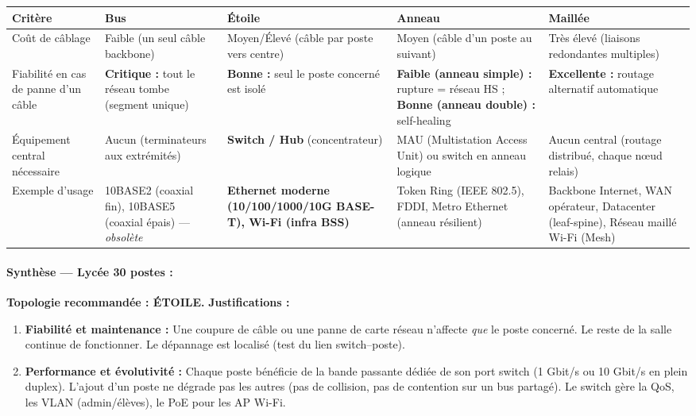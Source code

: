 \documentclass[11pt]{article}
\newcommand{\cle}[1]{{\popxbold\color{popdark}#1}}
\begin{document}
\begin{corrige}
\begin{center}
\begin{tabularx}{\linewidth}{|l|X|X|X|X|}
\hline
\rowcolor{popblueL} \textbf{Critère} & \textbf{Bus} & \textbf{\cle{Étoile}} & \textbf{\cle{Anneau}} & \textbf{\cle{Maillée}} \\
\hline
Coût de câblage & Faible (un seul câble backbone) & Moyen/Élevé (câble par poste vers centre) & Moyen (câble d'un poste au suivant) & Très élevé (liaisons redondantes multiples) \\
\hline
Fiabilité en cas de panne d'un câble & \textbf{Critique :} tout le réseau tombe (segment unique) & \textbf{Bonne :} seul le poste concerné est isolé & \textbf{Faible (anneau simple) :} rupture = réseau HS ; \textbf{Bonne (anneau double) :} self-healing & \textbf{Excellente :} routage alternatif automatique \\
\hline
Équipement central nécessaire & Aucun (terminateurs aux extrémités) & \textbf{Switch / Hub} (concentrateur) & MAU (Multistation Access Unit) ou switch en anneau logique & Aucun central (routage distribué, chaque nœud relais) \\
\hline
Exemple d'usage & 10BASE2 (coaxial fin), 10BASE5 (coaxial épais) — \emph{obsolète} & \textbf{Ethernet moderne (10/100/1000/10G BASE-T), Wi-Fi (infra BSS)} & Token Ring (IEEE 802.5), FDDI, Metro Ethernet (anneau résilient) & Backbone Internet, WAN opérateur, Datacenter (leaf-spine), Réseau maillé Wi-Fi (Mesh) \\
\hline
\end{tabularx}
\end{center}

\paragraph{Synthèse — Lycée 30 postes :}
\textbf{Topologie recommandée : \cle{ÉTOILE}.}
\textbf{Justifications :}
\begin{enumerate}
  \item \textbf{Fiabilité et maintenance :} Une coupure de câble ou une panne de carte réseau n'affecte \emph{que} le poste concerné. Le reste de la salle continue de fonctionner. Le dépannage est localisé (test du lien switch–poste).
  \item \textbf{Performance et évolutivité :} Chaque poste bénéficie de la bande passante dédiée de son port switch (1 Gbit/s ou 10 Gbit/s en plein duplex). L'ajout d'un poste ne dégrade pas les autres (pas de collision, pas de contention sur un bus partagé). Le switch gère la QoS, les VLAN (admin/élèves), le PoE pour les AP Wi-Fi.
\end{enumerate}
\end{corrige}
\end{document}
